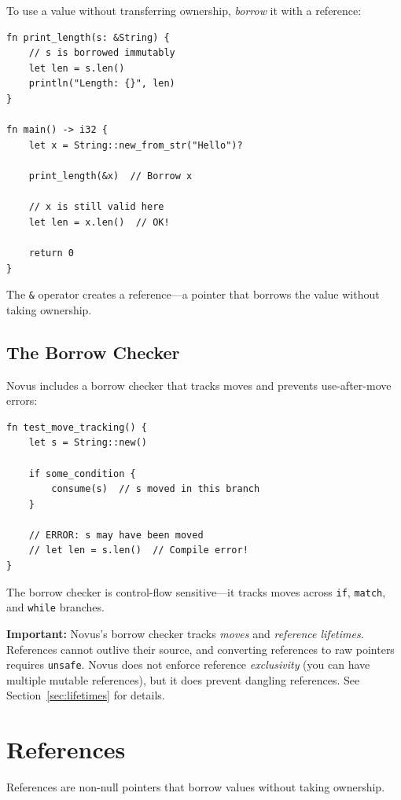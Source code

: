 To use a value without transferring ownership, \textit{borrow} it with a reference:

\begin{lstlisting}
fn print_length(s: &String) {
    // s is borrowed immutably
    let len = s.len()
    println("Length: {}", len)
}

fn main() -> i32 {
    let x = String::new_from_str("Hello")?

    print_length(&x)  // Borrow x

    // x is still valid here
    let len = x.len()  // OK!

    return 0
}
\end{lstlisting}

The \texttt{\&} operator creates a reference---a pointer that borrows the value without taking ownership.

\subsection{The Borrow Checker}

Novus includes a borrow checker that tracks moves and prevents use-after-move errors:

\begin{lstlisting}
fn test_move_tracking() {
    let s = String::new()

    if some_condition {
        consume(s)  // s moved in this branch
    }

    // ERROR: s may have been moved
    // let len = s.len()  // Compile error!
}
\end{lstlisting}

The borrow checker is control-flow sensitive---it tracks moves across \texttt{if}, \texttt{match}, and \texttt{while} branches.

\textbf{Important:} Novus's borrow checker tracks \textit{moves} and \textit{reference lifetimes}. References cannot outlive their source, and converting references to raw pointers requires \texttt{unsafe}. Novus does not enforce reference \textit{exclusivity} (you can have multiple mutable references), but it does prevent dangling references. See Section~\ref{sec:lifetimes} for details.

\section{References}

References are non-null pointers that borrow values without taking ownership.

